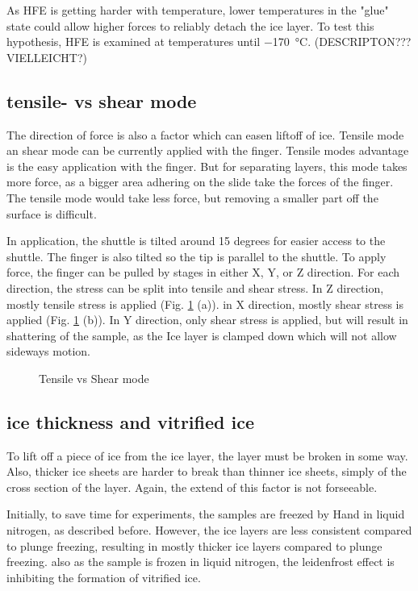 As HFE is getting harder with temperature, lower temperatures in the "glue" state could allow higher forces to reliably detach the ice layer. To test this hypothesis, HFE is examined at temperatures until \SI{-170}{\degreeCelsius}. (DESCRIPTON??? VIELLEICHT?)

\subsection{tensile- vs shear mode}

The direction of force is also a factor which can easen liftoff of ice. Tensile mode an shear mode can be currently applied with the finger. Tensile modes advantage is the easy application with the finger. But for separating layers, this mode takes more force, as a bigger area adhering on the slide take the forces of the finger. The tensile mode would take less force, but removing a smaller part off the surface is difficult.

In application, the shuttle is tilted around 15 degrees for easier access to the shuttle. The finger is also tilted so the tip is parallel to the shuttle. To apply force, the finger can be pulled by stages in either X, Y, or Z direction. For each direction, the stress can be split into tensile and shear stress. In Z direction, mostly tensile stress is applied (Fig. \ref{fig:tensilevsshear} (a)). in X direction, mostly shear stress is applied (Fig. \ref{fig:tensilevsshear} (b)). In Y direction, only shear stress is applied, but will result in shattering of the sample, as the Ice layer is clamped down which will not allow sideways motion.

\begin{figure}[hbt!]
	\centering
	
	\caption{Tensile vs Shear mode}
	\label{fig:tensilevsshear}
\end{figure}

\subsection{ice thickness and vitrified ice}

To lift off a piece of ice from the ice layer, the layer must be broken in some way. Also, thicker ice sheets are harder to break than thinner ice sheets, simply of the cross section of the layer. Again, the extend of this factor is not forseeable. 

Initially, to save time for experiments, the samples are freezed by Hand in liquid nitrogen, as described before. However, the ice layers are less consistent compared to plunge freezing, resulting in mostly thicker ice layers compared to plunge freezing. also as the sample is frozen in liquid nitrogen, the leidenfrost effect is inhibiting the formation of vitrified ice. 

